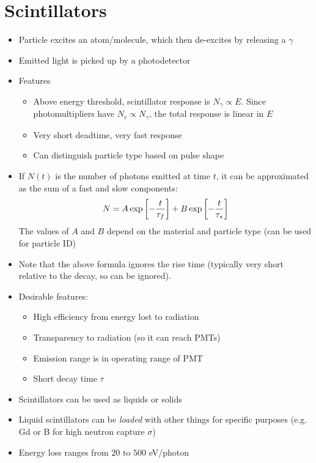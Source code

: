 \section{Scintillators}
\begin{itemize}
  \item Particle excites an atom/molecule, which then de-excites by releasing a $\gamma$
  \item Emitted light is picked up by a photodetector
  \item Features
  \begin{itemize}
    \item Above energy threshold, scintillator response is $N_\gamma \propto E$. Since photomultipliers have $N_e\propto N_\gamma$, the total response is linear in $E$
    \item Very short deadtime, very fast response
    \item Can distinguish particle type based on pulse shape
  \end{itemize}
  \item If $N(t)$ is the number of photons emitted at time $t$, it can be approximated as the sum of a fast and slow components:
  \begin{equation}
    N = A\exp \left[-\frac{t}{\tau_f}\right] + B\exp \left[-\frac{t}{\tau_{s\vphantom{f}}}\right]
  \end{equation}
  The values of $A$ and $B$ depend on the material and particle type (can be used for particle ID)
  \item Note that the above formula ignores the rise time (typically very short relative to the decay, so can be ignored).
  \item Desirable features:
  \begin{itemize}
    \item High efficiency from energy lost to radiation
    \item Transparency to radiation (so it can reach PMTs)
    \item Emission range is in operating range of PMT
    \item Short decay time $\tau$
  \end{itemize}
  \item Scintillators can be used as liquids or solids
  \item Liquid scintillators can be \emph{loaded} with other things for specific purposes (e.g. Gd or B for high neutron capture $\sigma$)
  \item Energy loss ranges from $20$ to $500$ eV/photon
\end{itemize}

